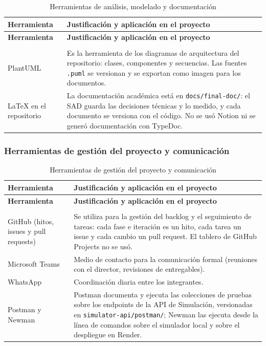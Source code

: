 \begin{center}
\renewcommand{\arraystretch}{1.2}
\begin{longtable}{|P{0.5}|P{0.5}|}
  \hline
  \textbf{Herramienta} & \textbf{Justificación y aplicación en el proyecto} \\
  \hline
  \endfirsthead
  \hline
  \textbf{Herramienta} & \textbf{Justificación y aplicación en el proyecto} \\
  \hline
  \endhead
  \caption{Herramientas de análisis, modelado y documentación}
  \label{tab:herramientas-documentacion}\\
  \endlastfoot
  PlantUML & Es la herramienta de los diagramas de arquitectura del repositorio: clases, componentes y secuencias. Las fuentes \texttt{.puml} se versionan y se exportan como imagen para los documentos. \\
  \hline
  LaTeX en el repositorio & La documentación académica está en \texttt{docs/final-doc/}: el SAD guarda las decisiones técnicas y lo medido, y cada documento se versiona con el código. No se usó Notion ni se generó documentación con TypeDoc. \\
  \hline
\end{longtable}
\end{center}

\subsubsection{Herramientas de gestión del proyecto y comunicación}

\begin{center}
\renewcommand{\arraystretch}{1.2}
\begin{longtable}{|P{0.5}|P{0.5}|}
  \hline
  \textbf{Herramienta} & \textbf{Justificación y aplicación en el proyecto} \\
  \hline
  \endfirsthead
  \hline
  \textbf{Herramienta} & \textbf{Justificación y aplicación en el proyecto} \\
  \hline
  \endhead
  \caption{Herramientas de gestión del proyecto y comunicación}
  \label{tab:herramientas-gestion}\\
  \endlastfoot
  GitHub (hitos, issues y pull requests) & Se utiliza para la gestión del backlog y el seguimiento de tareas: cada fase e iteración es un hito, cada tarea un issue y cada cambio un pull request. El tablero de GitHub Projects no se usó. \\
  \hline
  Microsoft Teams & Medio de contacto para la comunicación formal (reuniones con el director, revisiones de entregables). \\
  \hline
  WhatsApp & Coordinación diaria entre los integrantes. \\
  \hline
  Postman y Newman & Postman documenta y ejecuta las colecciones de pruebas sobre los endpoints de la API de Simulación, versionadas en \texttt{simulator-api/postman/}; Newman las ejecuta desde la línea de comandos sobre el simulador local y sobre el despliegue en Render. \\
  \hline
\end{longtable}
\end{center}

